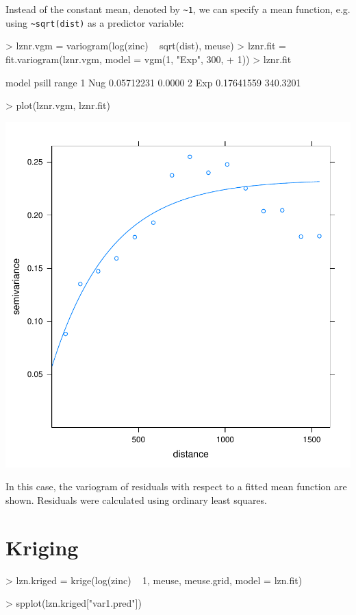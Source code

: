 \documentclass[a4paper]{article}
\begin{document}
Instead of the constant mean, denoted by \verb|~1|, we can specify a
mean function, e.g. using \verb|~sqrt(dist)| as a predictor variable:

\begin{Schunk}
\begin{Sinput}
> lznr.vgm = variogram(log(zinc) ~ sqrt(dist), meuse)
> lznr.fit = fit.variogram(lznr.vgm, model = vgm(1, "Exp", 300, 
+     1))
> lznr.fit
\end{Sinput}
\begin{Soutput}
  model      psill    range
1   Nug 0.05712231   0.0000
2   Exp 0.17641559 340.3201
\end{Soutput}
\begin{Sinput}
> plot(lznr.vgm, lznr.fit)
\end{Sinput}
\end{Schunk}

\includegraphics{gstat-009}

In this case, the variogram of residuals with respect to a fitted mean
function are shown. Residuals were calculated using ordinary least
squares.

\section{Kriging}

\begin{Schunk}
\begin{Sinput}
> lzn.kriged = krige(log(zinc) ~ 1, meuse, meuse.grid, model = lzn.fit)
\end{Sinput}
\begin{Soutput}
\end{Soutput}
\begin{Sinput}
> spplot(lzn.kriged["var1.pred"])
\end{Sinput}
\end{Schunk}
\end{document}
